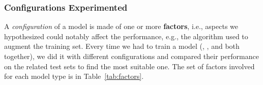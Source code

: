 
\subsubsection{Configurations Experimented}
\label{subsub:configs}

A \textit{configuration} of a model is made of one or more \textbf{factors}, i.e., aspects we hypothesized could notably affect the performance, e.g., the algorithm used to augment the training set.
Every time we had to train a model (\finder, \linker, and both together), we did it with different configurations and compared their performance on the related test sets to find the most suitable one.
The set of factors involved for each model type is in Table~\ref{tab:factors}.

